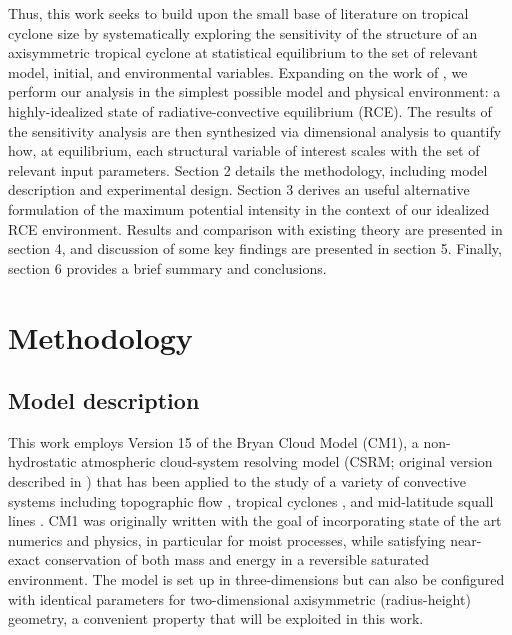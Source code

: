 \documentclass[12pt]{article}
\begin{document}
Thus, this work seeks to build upon the small base of literature on tropical cyclone size by systematically exploring the sensitivity of the structure of an axisymmetric tropical cyclone at statistical equilibrium to the set of relevant model, initial, and environmental variables. Expanding on the work of \cite{Hakim_2011}, we perform our analysis in the simplest possible model and physical environment: a highly-idealized state of radiative-convective equilibrium (RCE). The results of the sensitivity analysis are then synthesized via dimensional analysis to quantify how, at equilibrium, each structural variable of interest scales with the set of relevant input parameters. Section 2 details the methodology, including model description and experimental design. Section 3 derives an useful alternative formulation of the maximum potential intensity in the context of our idealized RCE environment. Results and comparison with existing theory are presented in section 4, and discussion of some key findings are presented in section 5. Finally, section 6 provides a brief summary and conclusions.

\section{Methodology}

\subsection{Model description}
This work employs Version 15 of the Bryan Cloud Model (CM1), a non-hydrostatic atmospheric cloud-system resolving model (CSRM; original version described in \cite{Bryan_Fritsch_2002}) that has been applied to the study of a variety of convective systems including topographic flow \citep{Miglietta_Rotunno_2010}, tropical cyclones \citep{Bryan_Rotunno_2009b, Bryan_2011}, and mid-latitude squall lines \citep{Parker_2008}.  CM1 was originally written with the goal of incorporating state of the art numerics and physics, in particular for moist processes, while satisfying near-exact conservation of both mass and energy in a reversible saturated environment. The model is set up in three-dimensions but can also be configured with identical parameters for two-dimensional axisymmetric (radius-height) geometry, a convenient property that will be exploited in this work.
\end{document}
